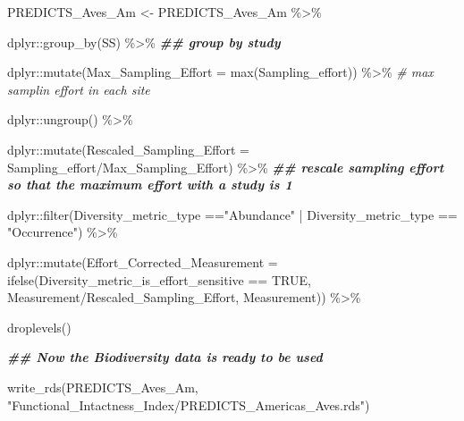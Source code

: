 \documentclass[
]{article}
\newenvironment{Shaded}{\begin{snugshade}}{\end{snugshade}}
\newcommand{\AttributeTok}[1]{\textcolor[rgb]{0.77,0.63,0.00}{#1}}
\newcommand{\CommentTok}[1]{\textcolor[rgb]{0.56,0.35,0.01}{\textit{#1}}}
\newcommand{\ConstantTok}[1]{\textcolor[rgb]{0.00,0.00,0.00}{#1}}
\newcommand{\DocumentationTok}[1]{\textcolor[rgb]{0.56,0.35,0.01}{\textbf{\textit{#1}}}}
\newcommand{\FunctionTok}[1]{\textcolor[rgb]{0.00,0.00,0.00}{#1}}
\newcommand{\NormalTok}[1]{#1}
\newcommand{\OtherTok}[1]{\textcolor[rgb]{0.56,0.35,0.01}{#1}}
\newcommand{\SpecialCharTok}[1]{\textcolor[rgb]{0.00,0.00,0.00}{#1}}
\newcommand{\StringTok}[1]{\textcolor[rgb]{0.31,0.60,0.02}{#1}}
\begin{document}
\begin{Shaded}
\begin{Highlighting}[]
\NormalTok{PREDICTS\_Aves\_Am }\OtherTok{\textless{}{-}}\NormalTok{ PREDICTS\_Aves\_Am }\SpecialCharTok{\%\textgreater{}\%} 
  
  
\NormalTok{  dplyr}\SpecialCharTok{::}\FunctionTok{group\_by}\NormalTok{(SS) }\SpecialCharTok{\%\textgreater{}\%} \DocumentationTok{\#\# group by study }
  
\NormalTok{  dplyr}\SpecialCharTok{::}\FunctionTok{mutate}\NormalTok{(}\AttributeTok{Max\_Sampling\_Effort =} \FunctionTok{max}\NormalTok{(Sampling\_effort)) }\SpecialCharTok{\%\textgreater{}\%}  \CommentTok{\# max samplin effort in each site}
  
\NormalTok{  dplyr}\SpecialCharTok{::}\FunctionTok{ungroup}\NormalTok{() }\SpecialCharTok{\%\textgreater{}\%}
  
\NormalTok{  dplyr}\SpecialCharTok{::}\FunctionTok{mutate}\NormalTok{(}\AttributeTok{Rescaled\_Sampling\_Effort =}\NormalTok{ Sampling\_effort}\SpecialCharTok{/}\NormalTok{Max\_Sampling\_Effort) }\SpecialCharTok{\%\textgreater{}\%}  \DocumentationTok{\#\# rescale sampling effort so that the maximum effort with a study is 1}
  
\NormalTok{  dplyr}\SpecialCharTok{::}\FunctionTok{filter}\NormalTok{(Diversity\_metric\_type }\SpecialCharTok{==}\StringTok{"Abundance"} \SpecialCharTok{|}\NormalTok{ Diversity\_metric\_type }\SpecialCharTok{==}  \StringTok{"Occurrence"}\NormalTok{) }\SpecialCharTok{\%\textgreater{}\%}
  
\NormalTok{  dplyr}\SpecialCharTok{::}\FunctionTok{mutate}\NormalTok{(}\AttributeTok{Effort\_Corrected\_Measurement =} \FunctionTok{ifelse}\NormalTok{(Diversity\_metric\_is\_effort\_sensitive }\SpecialCharTok{==} \ConstantTok{TRUE}\NormalTok{,}
\NormalTok{                                                      Measurement}\SpecialCharTok{/}\NormalTok{Rescaled\_Sampling\_Effort,}
\NormalTok{                                                      Measurement)) }\SpecialCharTok{\%\textgreater{}\%}
  
  \FunctionTok{droplevels}\NormalTok{()}

  \DocumentationTok{\#\# Now the Biodiversity data is ready to be used }
  
  \FunctionTok{write\_rds}\NormalTok{(PREDICTS\_Aves\_Am, }\StringTok{"Functional\_Intactness\_Index/PREDICTS\_Americas\_Aves.rds"}\NormalTok{)}
\end{Highlighting}
\end{Shaded}
\end{document}
